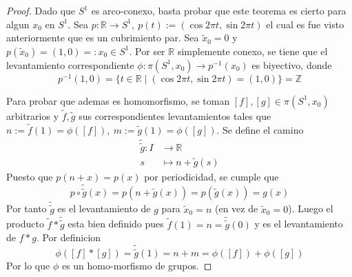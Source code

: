 \begin{proof}
  Dado que \(S^1\) es arco-conexo, basta probar que este teorema es
  cierto para algun \(x_0\) en \(S^1\). Sea \(p : \mathbb R \to S^1,\
  p(t) := (\cos 2 \pi t, \sin 2 \pi t)\) el cual es fue visto anteriormente
  que es un cubrimiento par. Sea \(\tilde x _0 = 0\) y \( p(\tilde x _0) =
  (1,0) =: x_0 \in S^1\). Por ser \(\mathbb R\) simplemente conexo, se
  tiene que el levantamiento correspondiente \(\phi : \pi (S^1, x_0) \to
  p^{-1} (x_0)\) es biyectivo, donde
  \[ p^{-1} (1,0) = \{t \in \mathbb R \mid (\cos 2 \pi t, \sin 2 \pi t)
    = (1, 0) \} = \mathbb Z \]

  Para probar que ademas es homomorfismo, se toman \([f], [g] \in \pi
  (S^1, x_0)\) arbitrarios y \(\tilde f, \tilde g\) sus correspondientes
  levantamientos tales que \(n := \tilde f (1) = \phi ([f]),\ m :=
  \tilde g (1) = \phi ([g])\). Se define el camino
  \begin{align*}
    \tilde{\tilde g} : I &\longrightarrow \mathbb R \\
    s &\longmapsto n + \tilde g (s)
  \end{align*}
  Puesto que \(p(n + x) = p(x)\) por periodicidad, se cumple que
  \[ p \circ \tilde{\tilde g} (x) = p (n + \tilde g (x)) = p (\tilde g
    (x)) = g (x) \]
  Por tanto \(\tilde{\tilde g}\) es el levantamiento de \(g\) para
  \(\tilde x_0 = n\) (en vez de \(\tilde x_0 = 0\)). Luego el producto
  \(\tilde f * \tilde{\tilde g}\) esta bien definido pues \(\tilde f (1)
  = n = \tilde{\tilde g} (0)\) y es el levantamiento de \(f * g\). Por
  definicion
  \[ \phi ([f] * [g]) = \tilde{\tilde g} (1) = n + m = \phi ([f]) + \phi ([g]) \]
  Por lo que \(\phi\) es un homo-morfismo de grupos.
\end{proof}

